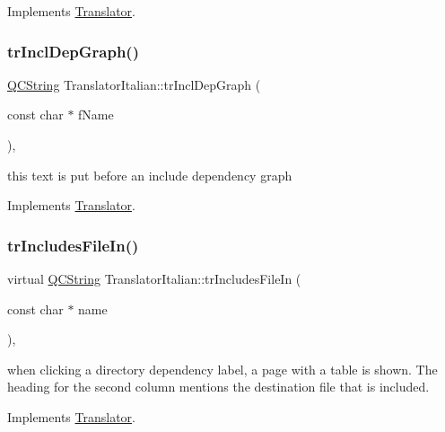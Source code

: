 Implements \mbox{\hyperlink{class_translator}{Translator}}.

\mbox{\label{class_translator_italian_aa8541ec29453686a4f580570e3b11e13}} 
\subsubsection{\texorpdfstring{trInclDepGraph()}{trInclDepGraph()}}
{\footnotesize\ttfamily \mbox{\hyperlink{class_q_c_string}{Q\+C\+String}} Translator\+Italian\+::tr\+Incl\+Dep\+Graph (\begin{DoxyParamCaption}\item[{const char $\ast$}]{f\+Name }\end{DoxyParamCaption})\hspace{0.3cm}{\ttfamily [inline]}, {\ttfamily [virtual]}}

this text is put before an include dependency graph 

Implements \mbox{\hyperlink{class_translator}{Translator}}.

\mbox{\label{class_translator_italian_ab672d5c6610c57b8abcedfc8bea00b10}} 
\subsubsection{\texorpdfstring{trIncludesFileIn()}{trIncludesFileIn()}}
{\footnotesize\ttfamily virtual \mbox{\hyperlink{class_q_c_string}{Q\+C\+String}} Translator\+Italian\+::tr\+Includes\+File\+In (\begin{DoxyParamCaption}\item[{const char $\ast$}]{name }\end{DoxyParamCaption})\hspace{0.3cm}{\ttfamily [inline]}, {\ttfamily [virtual]}}

when clicking a directory dependency label, a page with a table is shown. The heading for the second column mentions the destination file that is included. 

Implements \mbox{\hyperlink{class_translator}{Translator}}.

